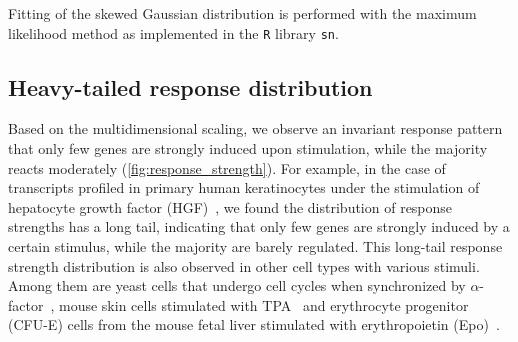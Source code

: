 Fitting of the skewed Gaussian distribution is performed with
the maximum likelihood method as implemented in the 
\texttt{R}
library \texttt{sn}.

\subsection{Heavy-tailed response distribution}
Based on the multidimensional scaling, we observe an 
invariant response pattern that only few genes are strongly 
induced upon stimulation, while the majority reacts
moderately (\ref{fig:response_strength}). 
For example, in the case of transcripts
profiled in primary human keratinocytes under the stimulation of 
hepatocyte growth factor (HGF)~\citep{Busch2008}, we found the distribution of response
strengths has a long tail, indicating that 
only few genes are strongly induced by a certain stimulus, while the majority 
are barely regulated. This long-tail response strength
distribution is also observed in other cell types with various stimuli.
Among them are yeast cells that undergo cell cycles when synchronized by 
$\alpha$-factor~\citep{Spellman1998,Cho1998}, mouse skin cells stimulated with TPA~\citep{Riehl2010} and erythrocyte progenitor
(CFU-E) cells from the mouse fetal liver stimulated with erythropoietin (Epo)~\citep{Bachmann2011}. 

